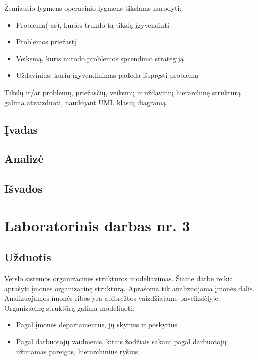 \documentclass[10pt]{IEEEtran}
\begin{document}
            Žemiausio lygmens operacinio lygmens tikslams nurodyti:

            \begin{itemize}
                \item Problemą(-as), kurios trukdo tą tikslą įgyvendinti
                \item Problemos priežastį
                \item Veiksmą, kuris nurodo problemos sprendimo strategiją
                \item Uždavinius, kurių įgyvendinimas padeda išspręsti problemą
            \end{itemize}

            Tikslų ir/ar problemų, priežasčių, veiksmų ir uždavinių hierarchinę struktūrą galima atvaizduoti, naudojant UML klasių diagramą.

        \subsection{Įvadas}

        \subsection{Analizė}

        \subsection{Išvados}

    \section{Laboratorinis darbas nr. 3}

        \subsection{Užduotis}

            Verslo sistemos organizacinės struktūros modeliavimas. Šiame darbe reikia aprašyti įmonės organizacinę struktūrą. Aprašoma tik analizuojama įmonės dalis. Analizuojamos įmonės ribos yra apibrėžtos vaizdžiajame paveikslėlyje. Organizacinę struktūrą galima modeliuoti:
            
            \begin{itemize}
                \item Pagal įmonės departamentus, jų skyrius ir poskyrius
                \item Pagal darbuotojų vaidmenis, kitais žodžiais sakant pagal darbuotojų užimamas pareigas, hierarchinius ryšius
            \end{itemize}
\end{document}
